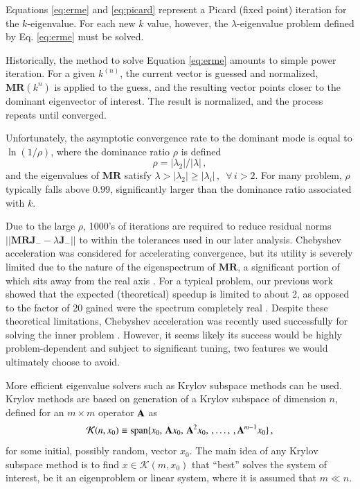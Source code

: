 Equations \ref{eq:erme} and \ref{eq:picard} represent
a Picard (fixed point) iteration
for the $k$-eigenvalue.  For each new $k$ value, however, the 
$\lambda$-eigenvalue problem defined by Eq. \ref{eq:erme} must be 
solved.

Historically, the method to solve Equation \ref{eq:erme} amounts to 
simple power iteration.
For a given $k^{(n)}$, the current vector is guessed and normalized, 
$\mathbf{MR}(k^{n})$ is applied to the guess, and the resulting vector 
points closer to the dominant eigenvector of interest.  The result 
is normalized, and the process repeats until converged. 

Unfortunately, the asymptotic convergence rate to the dominant mode is 
equal to $\ln{(1/\rho)}$, where the dominance ratio $\rho$  is defined
\begin{equation}
 \rho = |\lambda_2| / |\lambda| \, ,
\end{equation}
and the eigenvalues of 
$\mathbf{M}\mathbf{R}$ satisfy 
$\lambda > |\lambda_2| \geq |\lambda_i| \, , \,\,\, \forall \, i > 2$.  
For many problem, $\rho$ typically falls 
above $0.99$, significantly larger than the dominance ratio associated 
with $k$.

Due to the large $\rho$, 1000's of iterations are required to reduce 
residual norms $||\mathbf{MRJ}_- - \lambda \mathbf{J}_-||$ to within the
tolerances used in our later analysis.  
Chebyshev acceleration 
was considered for accelerating convergence, but its utility is severely 
limited due to the nature of the eigenspectrum of $\mathbf{MR}$, a 
significant portion of which sits away from the real axis .  
For a typical problem, our previous work 
showed that the expected (theoretical) speedup is limited to 
about 2, as opposed to the factor of 20 gained were the spectrum 
completely real \cite{roberts2012ksi}.
Despite these theoretical limitations, 
Chebyshev acceleration was recently used successfully for solving the inner 
problem \cite{zhang2012ehs}.  However, it seems likely its success would 
be highly problem-dependent and subject to significant tuning, two 
features we would ultimately choose to avoid.

More efficient eigenvalue solvers such as Krylov subspace 
methods can be used.  Krylov methods are based on generation
of a Krylov subspace of dimension $n$, 
defined for an $m \times m$ operator $\mathbf{A}$ as
\begin{equation}
 \mathcal{K}(n,x_0) \equiv \text{span} 
     \{x_0,\, \mathbf{A}x_0,\, \mathbf{A}^2x_0,\, 
         ,\ldots,\,, \mathbf{A}^{m-1}x_0 \} \, , 
 \label{eq:krylovsubspace}
\end{equation}
for some initial, possibly random, vector $x_0$.  The main idea of any Krylov
subspace method is to find  $x \in \mathcal{K}(m,x_0)$  
 that ``best'' solves the system of interest, be it an 
eigenproblem or linear system, where it is assumed that $m \ll n$.

